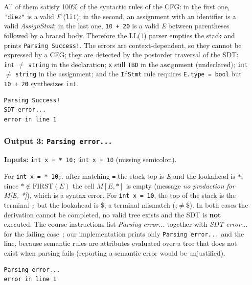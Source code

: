 \documentclass[11pt,a4paper]{article}
\newcommand{\nt}[1]{\textit{#1}}
\newcommand{\tk}[1]{\texttt{#1}}
\begin{document}
All of them satisfy 100\% of the syntactic rules of the CFG: in the first one, \texttt{"diez"} is a valid \nt{F} (\tk{lit}); in the second, an assignment with an identifier is a valid \nt{AssignStmt}; in the last one, \texttt{10 + 20} is a valid \nt{E} between parentheses followed by a braced body. Therefore the LL(1) parser empties the stack and prints \texttt{Parsing Success!}. The errors are context-dependent, so they cannot be expressed by a CFG; they are detected by the postorder traversal of the SDT: \texttt{int} $\ne$ \texttt{string} in the declaration; \texttt{x} still \texttt{TBD} in the assignment (undeclared); \texttt{int} $\ne$ \texttt{string} in the assignment; and the \texttt{IfStmt} rule requires \texttt{E.type = bool} but \texttt{10 + 20} synthesizes \texttt{int}.

\begin{lstlisting}
Parsing Success!
SDT error...
error in line 1
\end{lstlisting}

\subsubsection{Output 3: \texttt{Parsing error...}}
\textbf{Inputs:} \texttt{int x = * 10;} \quad \texttt{int x = 10} (missing semicolon).

For \texttt{int x = * 10;}, after matching \tk{=} the stack top is \nt{E} and the lookahead is \tk{*}; since $\tk{*}\notin\mathrm{FIRST}(\nt{E})$ the cell $M[\nt{E},\tk{*}]$ is empty (message \emph{no production for M[E, *]}), which is a syntax error. For \texttt{int x = 10}, the top of the stack is the terminal \tk{;} but the lookahead is \$, a terminal mismatch ($\tk{;}\neq\$$). In both cases the derivation cannot be completed, no valid tree exists and the SDT is \textbf{not} executed. The course instructions list \emph{Parsing error...} together with \emph{SDT error...} for the failing case~\cite{assignment}; our implementation prints only \texttt{Parsing error...} and the line, because semantic rules are attributes evaluated over a tree that does not exist when parsing fails (reporting a semantic error would be unjustified).

\begin{lstlisting}
Parsing error...
error in line 1
\end{lstlisting}
\end{document}
